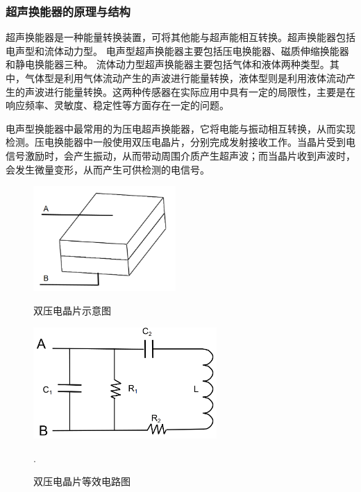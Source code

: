     \subsubsection{超声换能器的原理与结构}
    超声换能器是一种能量转换装置，可将其他能与超声能相互转换。超声换能器包括电声型和流体动力型。
    电声型超声换能器主要包括压电换能器、磁质伸缩换能器和静电换能器三种。
    流体动力型超声换能器主要包括气体和液体两种类型。其中，气体型是利用气体流动产生的声波进行能量转换，液体型则是利用液体流动产生的声波进行能量转换。这两种传感器在实际应用中具有一定的局限性，主要是在响应频率、灵敏度、稳定性等方面存在一定的问题。\par
    电声型换能器中最常用的为压电超声换能器，它将电能与振动相互转换，从而实现检测。压电换能器中一般使用双压电晶片，分别完成发射接收工作。当晶片受到电信号激励时，会产生振动，从而带动周围介质产生超声波；而当晶片收到声波时，会发生微量变形，从而产生可供检测的电信号。
    \begin{figure}[!h]

    	\begin{minipage}{0.5\textwidth}
    		\centering
    		\includegraphics[height=4cm]{figure/双压电晶片示意图.png}
    		\caption{双压电晶片示意图}
    		\label{双压电晶片示意图}
    	\end{minipage}
    \begin{minipage}{0.5\textwidth}
    	\centering
    	\includegraphics[height=4.25cm]{figure/双压电晶片等效电路.png}
    	\caption{双压电晶片等效电路图}
    	\label{双压电晶片等效电路图}.
    \end{minipage}
    \end{figure}

